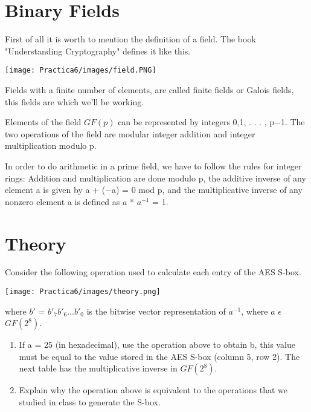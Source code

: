 \documentclass[12pt]{article}
\begin{document}
	\tableofcontents
	\newpage
	
    \section{Binary Fields}
        First of all it is worth to mention the definition of a field. The book "Understanding Cryptography" defines it like this.
        
        \begin{center}
            \texttt{[image: Practica6/images/field.PNG]}
        \end{center}
        
        Fields with a finite number of elements, are called finite fields or Galois fields, this fields are which we'll be working. 
        
        Elements of the field {$GF(p)$} can be represented by integers 0,1, . . . , p−1. The two operations of the field are modular integer addition and integer multiplication modulo p.

        In order to do arithmetic in a prime field, we have to follow the rules for integer rings: Addition and multiplication are done modulo p, the additive inverse of any element a is given by {a + (−a) = 0 mod p}, and the multiplicative inverse of any nonzero element a is defined as {$a$ * $a^{-1}$ = 1}.
        
    \section{Theory}
        Consider the following operation used to calculate each entry of the AES S-box.
        
        \begin{center}
            \texttt{[image: Practica6/images/theory.png]}
        \end{center}
        
        where {$b'$ = $b'_7b'_6...b'_0$} is the bitwise vector representation of {$a^{-1}$}, where {$a$ $\epsilon$ $GF(2^8)$}.
        
        \begin{enumerate}
            \item If a = 25 (in hexadecimal), use the operation above to obtain b, this value must be equal to the value stored in the AES S-box (column 5, row 2). The next table has the multiplicative inverse in {$GF(2^8)$}.
            \item Explain why the operation above is equivalent to the operations that we studied in class to generate the S-box.
        \end{enumerate}
       
\end{document}

